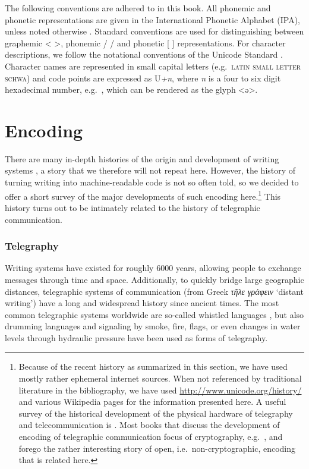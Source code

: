 The following conventions are adhered to in this book. All phonemic and phonetic
representations are given in the International Phonetic Alphabet (IPA), unless
noted otherwise \citep{IPA2015}. Standard conventions are used for
distinguishing between graphemic < >, phonemic / / and phonetic [ ]
representations. For character descriptions, we follow the notational
conventions of the Unicode Standard \citep{Unicode2018}. Character names are
represented in small capital letters (e.g.~\textsc{latin small letter schwa})
and code points are expressed as U\emph{+n}, where \emph{n} is a four to six
digit hexadecimal number, e.g.~, which can be rendered as the glyph <ə>.

\section{Encoding}
\label{encoding}

There are many in-depth histories of the origin and development of writing
systems \citep[e.g.~][]{Robinson1995,Powell2012}, a story that we therefore will
not repeat here. However, the history of turning writing into machine-readable
code is not so often told, so we decided to offer a short survey of the major
developments of such encoding here.\footnote{Because of the recent
history as summarized in this section, we have used mostly rather ephemeral
internet sources. When not referenced by traditional literature in the
bibliography, we have used \url{http://www.unicode.org/history/} and various
Wikipedia pages for the information presented here. A useful survey of the
historical development of the physical hardware of telegraphy and
telecommunication is \citet{Huurdeman2003}. Most books that discuss the
development of encoding of telegraphic communication focus of cryptography,
e.g.~\citet{Singh1999}, and forego the rather interesting story of open,
i.e.~non-cryptographic, encoding that is related here.} This history turns out
to be intimately related to the history of telegraphic communication.

\subsubsection*{Telegraphy}

Writing systems have existed for roughly 6000 years, allowing people to exchange
messages through time and space. Additionally, to quickly bridge large geographic
distances, telegraphic systems of communication (from Greek \emph{τῆλε
γράφειν} `distant writing') have a long and widespread history since ancient
times. The most common telegraphic systems worldwide are so-called whistled
languages \citep{Meyer2015}, but also drumming languages \citep{Meyer2012} and
signaling by smoke, fire, flags, or even changes in water levels through
hydraulic pressure have been used as forms of telegraphy. 

